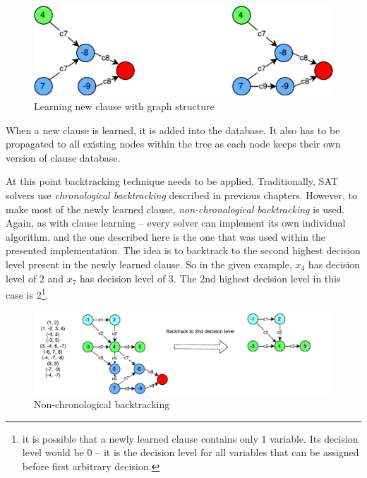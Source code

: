 \documentclass[12pt,english,pdflatex]{aghdpl}
\begin{document}
\begin{figure}[H]
\begin{centering}
\includegraphics[scale=0.7]{img/CDCL_implgraph}
\par\end{centering}
\caption{Learning new clause with graph structure}
\end{figure}

When a new clause is learned, it is added into the database. It also has
to be propagated to all existing nodes within the tree as each node keeps
their own version of clause database. 

At this point backtracking technique needs to be applied. Traditionally, SAT
solvers use \textit{chronological backtracking} described in previous chapters.
However, to make most of the newly learned clause, \textit{non-chronological backtracking}
is used. Again, as with clause learning -- every solver can implement
its own individual algorithm, and the one described here is the one
that was used within the presented implementation. The idea is to backtrack to the
second highest decision level present in the newly learned clause. So
in the given example, $x_4$ has decision level of 2 and $x_7$ has
decision level of 3. The 2nd highest decision level in this case is
2\footnote{it is possible that a newly learned
clause contains only 1 variable. Its decision level would be 0 -- it is the decision level for all variables that can be assigned before first arbitrary decision.}.

\begin{figure}[H]
\begin{centering}
\includegraphics[scale=0.6]{img/CDCL_BT}
\par\end{centering}
\caption{Non-chronological backtracking}
\end{figure}
\end{document}
